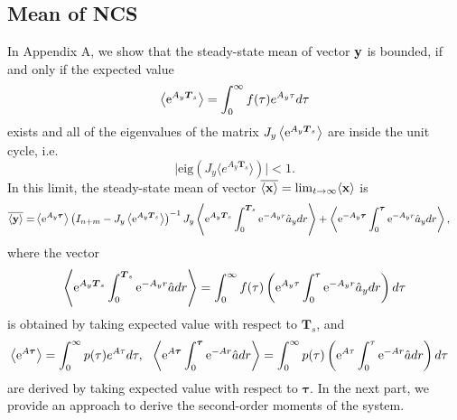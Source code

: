 \documentclass[letterpaper, 10 pt,one column, conference]{ieeeconf}  %
\begin{document}
\subsection{Mean of NCS}
In Appendix A, we show that the steady-state mean of vector $\bold y$ is bounded, if and only if the expected value 
	\begin{equation}
 \left\langle  {\rm e}^{ A_y \boldsymbol T_s} \right \rangle =  \int_0^{\infty}f(\tau) e^{A_y\tau }d \tau 
	\end{equation}
exists and all of the eigenvalues of the matrix $J_y \left\langle  {\rm e}^{ A_y \boldsymbol T_s} \right \rangle$ are inside the unit cycle, i.e.
\begin{equation}
\big \vert \text{eig}\left(J_y \langle e^{A_y \boldsymbol T_s} \rangle  \right) \big \vert <1 . \label{eigs0}
\end{equation}
In this limit, the steady-state mean of vector $\overline{\langle \bold x \rangle} =\lim_{t\to\infty}\langle \bold x \rangle$ is 
\begin{equation}
\begin{aligned}
\overline{\langle {\bold{y}} \rangle} =  & \left\langle {\rm e}^{ A_y\boldsymbol \tau} \right \rangle \left(I_{n +m}-J _y\left\langle {\rm e}^{ A_y\boldsymbol T_s} \right \rangle   \right)^{-1}J_y\left \langle  {\rm e}^{ A_y\boldsymbol T_s} \int_0^{\boldsymbol T_s}  {\rm e}^{ -A_yr} \hat{a}_y dr  \right \rangle  + \left \langle {\rm e}^{ -A_y \boldsymbol \tau}  \int_0^{\boldsymbol \tau}  {\rm e}^{ -A_yr} \hat{a}_y dr  \right \rangle , 
\label{mean of x general}	
\end{aligned}
\end{equation} 
where the vector
\begin{equation}
\left \langle  {\rm e}^{ A_y\boldsymbol T_s} \int_0^{\boldsymbol T_s}  {\rm e}^{ -A_yr} \hat{a} dr  \right \rangle  =  \int_0^{\infty} f(\tau )\left( {\rm e}^{ A_y\tau } \int_0^{\tau }  {\rm e}^{ -A_yr} \hat{a}_y dr \right)  d \tau 
\end{equation}
is obtained by taking expected value with respect to $\boldsymbol T_s$, and 
	\begin{align}
	& \left\langle  {\rm e}^{ A\boldsymbol \tau } \right \rangle =  \int_0^{\infty}p(\tau) e^{A\tau }d \tau, \ \  \left \langle  {\rm e}^{ A\boldsymbol \tau } \int_0^{\boldsymbol \tau }  {\rm e}^{ -Ar} \hat{a} dr  \right \rangle  =  \int_0^{\infty} p(\tau )\left( {\rm e}^{ A\tau } \int_0^{\tau }  {\rm e}^{ -Ar} \hat{a} dr \right)  d \tau 
	\end{align}
are derived by taking expected value with respect to $\boldsymbol \tau$.
In the next part, we provide an approach to derive the second-order moments of the system.
\end{document}
